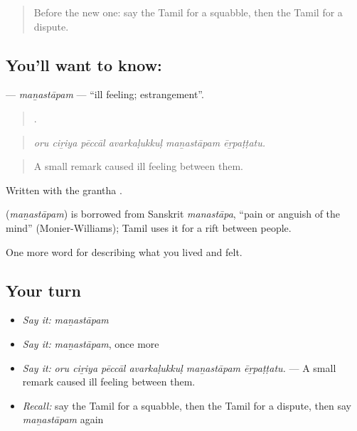 \label{lesson:TA-C501-manastapam}



\begin{quote}
Before the new one: say the Tamil for a squabble, then the Tamil for a dispute.
\end{quote}

\subsection*{You'll want to know: }
\textbf{} — \emph{maṉastāpam} — \textquotedblleft{}ill feeling; estrangement\textquotedblright{}.

\begin{quote}
     .
\end{quote}

\begin{quote}
\emph{oru ciṟiya pēccāl avarkaḷukkuḷ maṉastāpam ēṟpaṭṭatu.}
\end{quote}

\begin{quote}
A small remark caused ill feeling between them.
\end{quote}

Written with the grantha .

\begin{cousinweb}
\textbf{} (\emph{maṉastāpam}) is borrowed from Sanskrit \emph{manastāpa}, \textquotedblleft{}pain or anguish of the mind\textquotedblright{} (Monier-Williams); Tamil uses it for a rift between people.
\end{cousinweb}

\begin{grammarlens}[title={What you've built}]
One more word for describing what you lived and felt.
\end{grammarlens}

\subsection*{Your turn}
\begin{itemize}
\raggedright
  \item \emph{Say it:} \emph{maṉastāpam}
  \item \emph{Say it:} \emph{maṉastāpam}, once more
  \item \emph{Say it:} \emph{oru ciṟiya pēccāl avarkaḷukkuḷ maṉastāpam ēṟpaṭṭatu.} — A small remark caused ill feeling between them.
  \item \emph{Recall:} say the Tamil for a squabble, then the Tamil for a dispute, then say \emph{maṉastāpam} again
\end{itemize}

